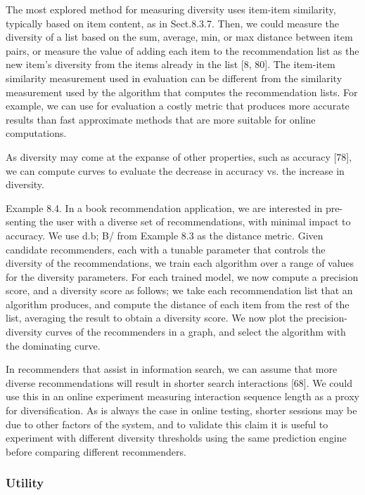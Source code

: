 The most explored method for measuring diversity uses item-item similarity, typically based on item content, as in Sect.8.3.7. Then, we could measure the diversity of a list based on the sum, average, min, or max distance between item pairs, or measure the value of adding each item to the recommendation list as the new item’s diversity from the items already in the list [8, 80]. The item-item similarity measurement used in evaluation can be different from the similarity measurement used by the algorithm that computes the recommendation lists. For example, we can use for evaluation a costly metric that produces more accurate results than fast approximate methods that are more suitable for online computations.

As diversity may come at the expanse of other properties, such as accuracy [78], we can compute curves to evaluate the decrease in accuracy vs. the increase in diversity.

Example 8.4. In a book recommendation application, we are interested in pre- senting the user with a diverse set of recommendations, with minimal impact to accuracy. We use d.b; B/ from Example 8.3 as the distance metric. Given candidate recommenders, each with a tunable parameter that controls the diversity of the recommendations, we train each algorithm over a range of values for the diversity parameters. For each trained model, we now compute a precision score, and a diversity score as follows; we take each recommendation list that an algorithm produces, and compute the distance of each item from the rest of the list, averaging the result to obtain a diversity score. We now plot the precision-diversity curves of the recommenders in a graph, and select the algorithm with the dominating curve.

In recommenders that assist in information search, we can assume that more diverse recommendations will result in shorter search interactions [68]. We could use this in an online experiment measuring interaction sequence length as a proxy for diversification. As is always the case in online testing, shorter sessions may be due to other factors of the system, and to validate this claim it is useful to experiment with different diversity thresholds using the same prediction engine before comparing different recommenders.

\subsubsection{Utility}

